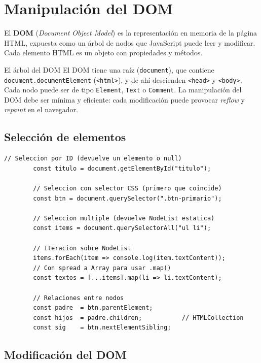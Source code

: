 \documentclass[11pt,a4paper,openany]{book}
\begin{document}
	\section{Manipulación del DOM}
	\label{sec:4.dom}
	
	El \textbf{DOM} (\emph{Document Object Model}) es la
	representación en memoria de la página HTML, expuesta como un
	árbol de nodos que JavaScript puede leer y modificar. Cada
	elemento HTML es un objeto con propiedades y métodos.
	
	\begin{cajadefinicion}{El árbol del DOM}
		El DOM tiene una raíz (\texttt{document}), que contiene
		\texttt{document.documentElement} (\texttt{<html>}), y de ahí
		descienden \texttt{<head>} y \texttt{<body>}. Cada nodo puede
		ser de tipo \texttt{Element}, \texttt{Text} o \texttt{Comment}.
		La manipulación del DOM debe ser mínima y eficiente: cada
		modificación puede provocar \emph{reflow} y \emph{repaint}
		en el navegador.
	\end{cajadefinicion}
	
	\subsection{Selección de elementos}
	\label{sub:4.dom.select}
	
	\begin{lstlisting}[style=js,numbers=none,caption={Métodos de selección del DOM},
		label=lst:4.10]
		// Seleccion por ID (devuelve un elemento o null)
		const titulo = document.getElementById("titulo");
		
		// Seleccion con selector CSS (primero que coincide)
		const btn = document.querySelector(".btn-primario");
		
		// Seleccion multiple (devuelve NodeList estatica)
		const items = document.querySelectorAll("ul li");
		
		// Iteracion sobre NodeList
		items.forEach(item => console.log(item.textContent));
		// Con spread a Array para usar .map()
		const textos = [...items].map(li => li.textContent);
		
		// Relaciones entre nodos
		const padre  = btn.parentElement;
		const hijos  = padre.children;           // HTMLCollection
		const sig    = btn.nextElementSibling;
	\end{lstlisting}
	
	\subsection{Modificación del DOM}
	\label{sub:4.dom.modify}
	
\end{document}
